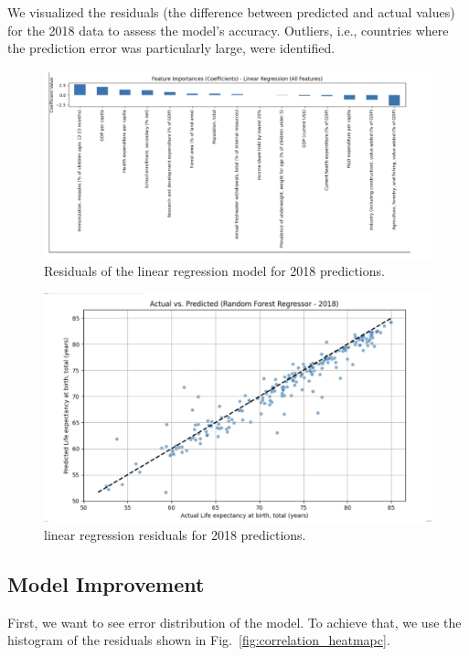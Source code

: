 \documentclass{article}
\begin{document}
We visualized the residuals (the difference between predicted and actual values) for the 2018 data to assess the model's accuracy. Outliers, i.e., countries where the prediction error was particularly large, were identified.
\begin{figure}[h]
    \centering
    \includegraphics[width=0.8\columnwidth]{./pic/T1.b.1.png} %
    \caption{Residuals of the linear regression model for 2018 predictions.}
    \label{fig:correlation_heatmap}
\end{figure}

\begin{figure}[h]
    \centering
    \includegraphics[width=0.8\columnwidth]{./pic/T1.b.2.png} %
    \caption{linear regression residuals for 2018 predictions.}
    \label{fig:correlation_heatmap}
\end{figure}

\subsection{Model Improvement}
\label{ssec:model_improvement}

First, we want to see error distribution of the model. To achieve that, we use the histogram of the residuals
shown in Fig.~\ref{fig:correlation_heatmapc}.
\end{document}
